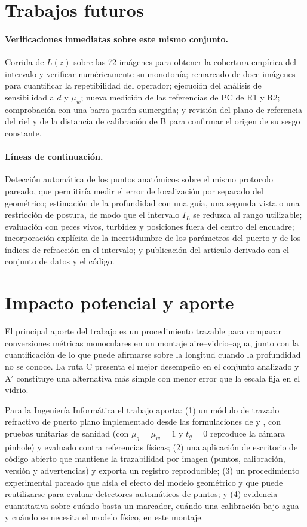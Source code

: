 \documentclass{report}
\newcommand{\Aprime}{A$'$}
\newcommand{\IL}{I_L}
\begin{document}
\section{Trabajos futuros}

\paragraph{Verificaciones inmediatas sobre este mismo conjunto.} Corrida de $L(z)$ sobre las 72 imágenes para obtener la cobertura empírica del intervalo y verificar numéricamente su monotonía; remarcado de doce imágenes para cuantificar la repetibilidad del operador; ejecución del análisis de sensibilidad a $d$ y $\mu_w$; nueva medición de las referencias de PC de R1 y R2; comprobación con una barra patrón sumergida; y revisión del plano de referencia del riel y de la distancia de calibración de B para confirmar el origen de su sesgo constante.

\paragraph{Líneas de continuación.} Detección automática de los puntos anatómicos sobre el mismo protocolo pareado, que permitiría medir el error de localización por separado del geométrico; estimación de la profundidad con una guía, una segunda vista o una restricción de postura, de modo que el intervalo $\IL$ se reduzca al rango utilizable; evaluación con peces vivos, turbidez y posiciones fuera del centro del encuadre; incorporación explícita de la incertidumbre de los parámetros del puerto y de los índices de refracción en el intervalo; y publicación del artículo derivado con el conjunto de datos y el código.

\section{Impacto potencial y aporte}

El principal aporte del trabajo es un procedimiento trazable para comparar conversiones métricas monoculares en un montaje aire--vidrio--agua, junto con la cuantificación de lo que puede afirmarse sobre la longitud cuando la profundidad no se conoce. La ruta C presenta el mejor desempeño en el conjunto analizado y \Aprime{} constituye una alternativa más simple con menor error que la escala fija en el vidrio.

Para la Ingeniería Informática el trabajo aporta: (1) un módulo de trazado refractivo de puerto plano implementado desde las formulaciones de \textcite{Agrawal2012} y \textcite{Treibitz2012}, con pruebas unitarias de sanidad (con $\mu_g = \mu_w = 1$ y $t_g = 0$ reproduce la cámara pinhole) y evaluado contra referencias físicas; (2) una aplicación de escritorio de código abierto que mantiene la trazabilidad por imagen (puntos, calibración, versión y advertencias) y exporta un registro reproducible; (3) un procedimiento experimental pareado que aísla el efecto del modelo geométrico y que puede reutilizarse para evaluar detectores automáticos de puntos; y (4) evidencia cuantitativa sobre cuándo basta un marcador, cuándo una calibración bajo agua y cuándo se necesita el modelo físico, en este montaje.
\end{document}
